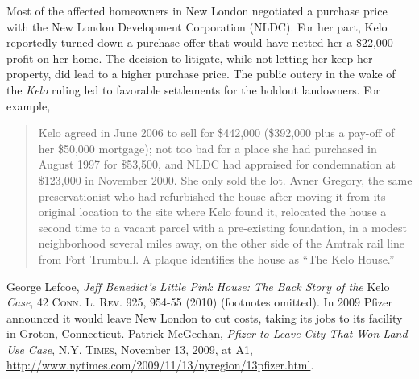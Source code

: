 \item Most of the affected homeowners in New London negotiated a purchase price
with the New London Development Corporation (NLDC). For her part, Kelo
reportedly turned down a purchase offer that would have netted her a \$22,000
profit on her home. The decision to litigate, while not letting her keep her
property, did lead to a higher purchase price. The public outcry in the wake of
the \textit{Kelo} ruling led to favorable settlements for the holdout
landowners. For example,
\begin{quote}
Kelo agreed in June 2006 to sell for \$442,000 (\$392,000 plus a pay-off of her
\$50,000 mortgage); not too bad for a place she had purchased in August 1997 for
\$53,500, and NLDC had appraised for condemnation at \$123,000 in November 2000.
She only sold the lot. Avner Gregory, the same preservationist who had
refurbished the house after moving it from its original location to the site
where Kelo found it, relocated the house a second time to a vacant parcel with a
pre-existing foundation, in a modest neighborhood several miles away, on the
other side of the Amtrak rail line from Fort Trumbull. A plaque identifies the
house as ``The Kelo House.'' 
\end{quote}
George Lefcoe, \textit{Jeff Benedict's Little Pink House: The Back Story of the}
Kelo \textit{Case}, 42 \textsc{Conn. L. Rev}. 925, 954-55 (2010) (footnotes
omitted). In 2009 Pfizer announced it would leave New London to cut costs,
taking its jobs to its facility in Groton, Connecticut. Patrick McGeehan,
\emph{Pfizer to Leave City That Won Land-Use Case}, \textsc{N.Y. Times},
November 13, 2009, at A1,
\url{http://www.nytimes.com/2009/11/13/nyregion/13pfizer.html}. 

